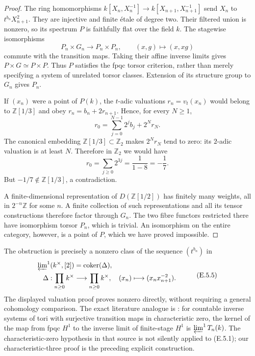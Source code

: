 \begin{proof}
The ring homomorphisms
$k[X_n,X_n^{-1}]\to k[X_{n+1},X_{n+1}^{-1}]$ send
$X_n$ to $t^{b_n}X_{n+1}^2$. They are injective and finite \'etale of
degree two. Their filtered union is nonzero, so its spectrum $P$ is
faithfully flat over the field $k$. The stagewise isomorphisms
\[
 P_n\times G_n\longrightarrow P_n\times P_n,\qquad
 (x,g)\longmapsto(x,xg)
\]
commute with the transition maps. Taking their affine inverse limits
gives $P\times G\simeq P\times P$. Thus $P$ satisfies the fpqc torsor
criterion, rather than merely specifying a system of unrelated
torsor classes. Extension of its structure group to $G_n$ gives $P_n$.

If $(x_n)$ were a point of $P(k)$, the $t$-adic valuations
$r_n=v_t(x_n)$ would belong to $\mathbb Z[1/3]$ and obey
$r_n=b_n+2r_{n+1}$. Hence, for every $N\geq1$,
\[
 r_0=\sum_{j=0}^{N-1}2^j b_j+2^Nr_N.
 \tag{E.5.3}
\]
The canonical embedding $\mathbb Z[1/3]\subset\mathbb Z_2$ makes
$2^Nr_N$ tend to zero: its $2$-adic valuation is at least $N$.
Therefore in $\mathbb Z_2$ we would have
\[
 r_0=\sum_{j\geq0}2^{3j}=\frac{1}{1-8}=-\frac17.
 \tag{E.5.4}
\]
But $-1/7\notin\mathbb Z[1/3]$, a contradiction.

A finite-dimensional representation of $D(\mathbb Z[1/2])$ has
finitely many weights, all in $2^{-n}\mathbb Z$ for some $n$. A finite
collection of such representations and all its tensor constructions
therefore factor through $G_n$. The two fibre functors restricted
there have isomorphism torsor $P_n$, which is trivial. An isomorphism
on the entire category, however, is a point of $P$, which we have
proved impossible.
\end{proof}

The obstruction is precisely a nonzero class of the sequence
$(t^{b_n})$ in
\[
 \begin{aligned}
 \varprojlim\nolimits^1(k^\times,[2])
 &=\operatorname{coker}(\Delta),\\
 \Delta:\prod_{n\geq0}k^\times&\longrightarrow\prod_{n\geq0}k^\times,
 & (x_n)&\longmapsto(x_nx_{n+1}^{-2}).
 \end{aligned}
 \tag{E.5.5}
\]
The displayed valuation proof proves nonzero directly, without
requiring a general cohomology comparison. The exact literature
analogue is \citet[Proposition 2.8 and Lemma 2.10, author-PDF
pp.~17--18]{D_Milne2003}: for countable inverse systems of tori with
surjective transition maps in characteristic zero, the kernel of the
map from fpqc $H^1$ to the
inverse limit of finite-stage $H^1$ is $\varprojlim^1 T_n(k)$.
The characteristic-zero hypothesis in that source is not silently
applied to (E.5.1); our characteristic-three proof is the preceding
explicit construction.


